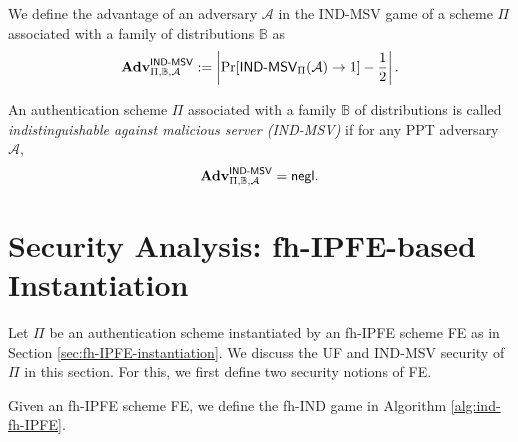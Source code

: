 



We define the advantage of an adversary $\mathcal{A}$ in the \textsf{IND-MSV} game of a scheme $\Pi$ associated with a family of distributions $\mathbb{B}$ as
\[
	\mathbf{Adv}^{\textsf{IND-MSV}}_{\Pi, \mathbb{B}, \mathcal{A}} := \left |\Pr[\textsf{IND-MSV}_{\Pi}(\mathcal{A}) \to 1] - \frac{1}{2} \right|.
\]

An authentication scheme $\Pi$ associated with a family $\mathbb{B}$ of distributions is called \emph{indistinguishable against malicious server (IND-MSV)} if for any PPT adversary $\mathcal{A}$,
\[
	\mathbf{Adv}^{\textsf{IND-MSV}}_{\Pi, \mathbb{B}, \mathcal{A}} = \mathsf{negl}.
\]

\newpage

\section{Security Analysis: fh-IPFE-based Instantiation}
\label{sec:security_analysis:fh-IPFE}

Let $\Pi$ be an authentication scheme instantiated by an fh-IPFE scheme \textsf{FE} as in Section \ref{sec:fh-IPFE-instantiation}. We discuss the UF and IND-MSV security of $\Pi$ in this section. For this, we first define two security notions of \textsf{FE}.

Given an fh-IPFE scheme \textsf{FE}, we define the \textsf{fh-IND} game \cite{cryptoeprint:2023/481} in Algorithm \ref{alg:ind-fh-IPFE}.

